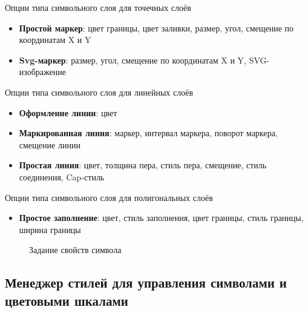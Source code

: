 \begin{description}
\item Опции типа символьного слоя для точечных слоёв
\begin{itemize}[label=--]
\item \textbf{Простой маркер}: цвет границы, цвет заливки, размер, угол,
смещение по координатам X и Y
\item \textbf{Svg-маркер}: размер, угол, смещение по координатам X и Y,
SVG-изображение
\end{itemize}
\item Опции типа символьного слоя для линейных слоёв
\begin{itemize}[label=--]
\item \textbf{Оформление линии}: цвет
\item \textbf{Маркированная линия}: маркер, интервал маркера, поворот
маркера, смещение линии
\item \textbf{Простая линия}: цвет, толщина пера, стиль пера, смещение,
стиль соединения, Cap-стиль
\end{itemize}
\item Опции типа символьного слоя для полигональных слоёв
\begin{itemize}[label=--]
\item \textbf{Простое заполнение}: цвет, стиль заполнения, цвет границы,
стиль границы, ширина границы
\end{itemize}
\end{description}


\begin{figure}[ht]
\centering
   \hspace{1cm}
   \hspace{1cm}
\caption{Задание свойств символа \wincaption}
\end{figure}

\subsection{Менеджер стилей для управления символами и цветовыми шкалами}\label{subsec:stylemanager}

